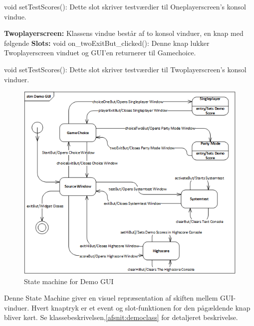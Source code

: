 \noindent void setTestScores():\newline
Dette slot skriver testværdier til Oneplayerscreen's konsol vindue.\newline

\noindent \textbf{Twoplayerscreen:}\newline
Klassens vindue består af to konsol vinduer, en knap med følgende\newline
\noindent \textbf{Slots:}\newline
void on\_twoExitBut\_clicked():\newline
Denne knap lukker Twoplayerscreen vinduet og GUI'en returnerer til Gamechoice.\newline

\noindent void setTestScores():\newline
Dette slot skriver testværdier til Twoplayerscreen's konsol vinduer.

\begin{figure}[H]
	\centering
	\includegraphics[width=1.2\textwidth]{Afsnit/DesignOgImplementering/images/StateMachineDemoGUI}
	\caption{State machine for Demo GUI}
	\label{fig:StateMachineDemo}
\end{figure}

Denne State Machine giver en visuel repræsentation af skiften mellem GUI-vinduer.  Hvert knaptryk er et event og slot-funktionen for den pågældende knap bliver kørt.
Se klassebeskrivelsen,\ref{afsnit:democlass} for detaljeret beskrivelse.

